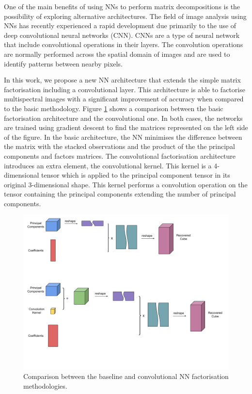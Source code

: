 \documentclass[essd, manuscript]{copernicus}
\begin{document}
One of the main benefits of using NNs to perform matrix decompositions is the possibility of exploring alternative architectures. The field of image analysis using NNs has recently experienced a rapid development due primarily to the use of deep convolutional neural networks (CNN). CNNs are a type of neural network that include convolutional operations in their layers. The convolution operations are normally performed across the spatial domain of images and are used to identify patterns between nearby pixels.

In this work, we propose a new NN architecture that extends the simple matrix factorisation including a convolutional layer. This architecture is able to factorise multispectral images with a significant improvement of accuracy when compared to the basic methodology. Figure \ref{factorisation_methods} shows a comparison between the basic factorisation architecture and the convolutional one. In both cases, the networks are trained using gradient descent to find the matrices represented on the left side of the figure. In the basic architecture, the NN minimises the difference between the matrix with the stacked observations and the product of the the principal components and factors matrices. The convolutional factorisation architecture introduces an extra element, the convolutional kernel. This kernel is a 4-dimensional tensor which is applied to the principal component tensor in its original 3-dimensional shape. This kernel performs a convolution operation on the tensor containing the principal components extending the number of principal components. 

\begin{figure}%
    \includegraphics[width=14cm]{fig6.png}
    \caption{Comparison between the baseline and convolutional NN factorisation methodologies.}%
    \label{factorisation_methods}%
\end{figure}
\end{document}
